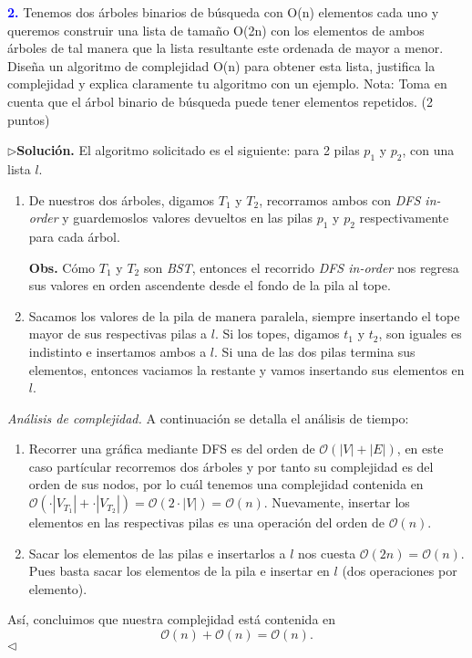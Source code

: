 \textbf{\textcolor{blue}{2.}} Tenemos dos árboles binarios de búsqueda con O(n) elementos cada uno y queremos construir una lista de tamaño O(2n)  con los elementos de ambos árboles de tal manera que la lista resultante este ordenada de mayor a menor. Diseña un algoritmo de complejidad O(n) para obtener esta lista, justifica la complejidad y explica claramente tu algoritmo con un ejemplo. Nota: Toma en cuenta que el árbol binario de búsqueda puede tener elementos repetidos. (2 puntos)\newline


$\rhd$\textbf{Solución.} El algoritmo solicitado es el siguiente: para 2 pilas $p_1$ y $p_2$,
con una lista $l$.
\begin{enumerate}
\item De nuestros dos árboles, digamos $T_1$ y $T_2$, recorramos ambos con \textit{DFS in-order}
  y guardemoslos valores devueltos en las pilas $p_1$ y $p_2$ respectivamente para cada árbol.\newline

  \textbf{Obs.} Cómo $T_1$ y $T_2$ son \textit{BST}, entonces el recorrido \textit{DFS in-order}
  nos regresa sus valores en orden ascendente desde el fondo de la pila al tope.
\item Sacamos los valores de la pila de manera paralela, siempre insertando el tope mayor de
  sus respectivas pilas a $l$. Si los topes, digamos $t_1$ y $t_2$, son iguales es indistinto e
  insertamos ambos a $l$. Si una de las dos pilas termina sus elementos, entonces vaciamos la
  restante y vamos insertando sus elementos en $l$.
\end{enumerate}
\textit{Análisis de complejidad.} A continuación se detalla el análisis de tiempo:
\begin{enumerate}
\item Recorrer una gráfica mediante DFS es del orden de $\mathcal{O}(|V| + |E|)$, en este caso
  partícular recorremos dos árboles y por tanto su complejidad es del orden de sus nodos, por lo cuál
  tenemos una complejidad contenida en $\mathcal{O}(\cdot|V_{T_1}| + \cdot|V_{T_2}|) = \mathcal{O}(2\cdot|V|) = \mathcal{O}(n)$. Nuevamente, insertar los elementos en las respectivas pilas es una operación del
  orden de $\mathcal{O}(n)$.
\item Sacar los elementos de las pilas e insertarlos a $l$ nos cuesta $\mathcal{O}(2n) = \mathcal{O}(n)$.
  Pues basta sacar los elementos de la pila e insertar en $l$ (dos operaciones por elemento).
\end{enumerate}
Así, concluimos que nuestra complejidad está contenida en
\[\mathcal{O}(n) + \mathcal{O}(n) = \mathcal{O}(n).\]
\hfill $\lhd$
